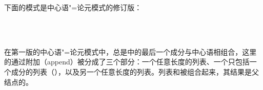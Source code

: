 下面的模式是中心语"=论元模式的修订版：
\begin{samepage}
\begin{schema}
\label{schema-bin-prel2}
~\\
 \impl\\
\end{schema}
\end{samepage}
在第一版的中心语"=论元模式中，总是\subcatlc 中的最后一个成分与中心语相组合，这里的\subcatlc 通过附加（append）被分成了三个部分：一个任意长度的列表、一个只包括一个成分的列表（），以及另一个任意长度的列表。列表和被组合起来，其结果是父结点的\subcatvc。

